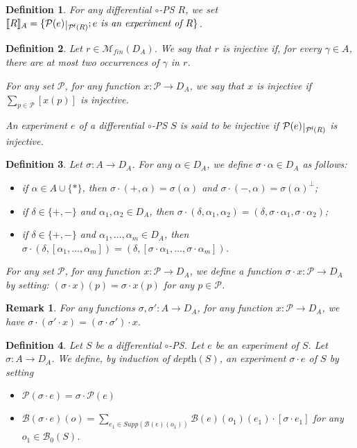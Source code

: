 \documentclass{article}
\theoremstyle{plain}
\newtheorem{definition}{Definition}
\newtheorem{rem}{Remark}
\newcommand{\finitemultisets}[1]{\mathcal{M}_\textit{fin}(#1)}
\newcommand{\depthof}[1]{\textit{depth}(#1)}
\def\restriction#1#2{\mathchoice
              {\setbox1\hbox{${\displaystyle #1}_{\scriptstyle #2}$}
              \restrictionaux{#1}{#2}}
              {\setbox1\hbox{${\textstyle #1}_{\scriptstyle #2}$}
              \restrictionaux{#1}{#2}}
              {\setbox1\hbox{${\scriptstyle #1}_{\scriptscriptstyle #2}$}
              \restrictionaux{#1}{#2}}
              {\setbox1\hbox{${\scriptscriptstyle #1}_{\scriptscriptstyle #2}$}
              \restrictionaux{#1}{#2}}}
\def\restrictionaux#1#2{{#1\,\smash{\vrule height .8\ht1 depth .85\dp1}}_{\,#2}}
\newcommand{\ports}[1]{\mathcal{P}(#1)}
\newcommand{\conclusions}[1]{\mathcal{P}^{\textsf{f}}(#1)}
\newcommand{\sm}[1]{\llbracket #1 \rrbracket}
\newcommand{\boxes}[1]{\mathcal{B}(#1)}
\newcommand{\boxesatzero}[1]{\mathcal{B}_{0}(#1)}
\newcommand{\supp}[1]{\textit{Supp}(#1)}
\begin{document}
\begin{definition}
For any differential $\circ$-PS $R$, we set $\sm{R}_A = \{ \restriction{\ports{e}}{\conclusions{R}} ; e \textit{ is an experiment of } R \}$.
\end{definition}

\begin{definition}\label{defin: injective}
Let $r \in \finitemultisets{D_A}$. We say that $r$ is \emph{injective} if, for every $\gamma \in A$, there are at most two occurrences of $\gamma$ in $r$. 

For any set $\mathcal{P}$, for any function $x : \mathcal{P} \to D_A$, we say that $x$ is \emph{injective} if $\sum_{p \in \mathcal{P}} [x(p)]$ is injective.

An experiment $e$ of a differential $\circ$-PS $S$ is said to be \emph{injective} if $\restriction{\ports{e}}{\conclusions{R}}$ is injective.
\end{definition}

\begin{definition}
Let $\sigma : A \to D_A$. For any $\alpha \in D_A$, we define $\sigma \cdot \alpha \in D_A$ as follows:
\begin{itemize}
\item if $\alpha \in A \cup \{ \ast \}$, then $\sigma \cdot (+, \alpha) = \sigma(\alpha)$ and $\sigma \cdot (-, \alpha) = \sigma(\alpha)^\perp$;
\item if $\delta \in \{ +, - \}$ and $\alpha_1, \alpha_2 \in D_A$, then $\sigma \cdot (\delta, \alpha_1, \alpha_2) = (\delta, \sigma \cdot \alpha_1, \sigma \cdot \alpha_2)$;
\item if $\delta \in \{ +, - \}$ and $\alpha_1, \ldots, \alpha_m \in D_A$, then $\sigma \cdot (\delta, [\alpha_1, \ldots, \alpha_m]) = (\delta, [\sigma \cdot \alpha_1, \ldots, \sigma \cdot \alpha_m])$.
\end{itemize}
For any set $\mathcal{P}$, for any function $x : \mathcal{P} \to D_A$, we define a function $\sigma \cdot x : \mathcal{P} \to D_A$ by setting: $(\sigma \cdot x)(p) = \sigma \cdot x(p)$ for any $p \in \mathcal{P}$.
\end{definition}

\begin{rem}
For any functions $\sigma, \sigma' : A \to D_A$, for any function $x : \mathcal{P} \to D_A$, we have $\sigma \cdot (\sigma' \cdot x) = (\sigma \cdot \sigma') \cdot x$.
\end{rem}

\begin{definition}
Let $S$ be a differential $\circ$-PS. Let $e$ be an experiment of $S$. Let $\sigma : A \to D_A$. We define, by induction of $\depthof{S}$, an experiment $\sigma \cdot e$ of $S$ by setting 
\begin{itemize}
\item $\ports{\sigma \cdot e} = \sigma \cdot \ports{e}$
\item $\boxes{\sigma \cdot e}(o) = \sum_{e_1 \in \supp{\boxes{e}(o_1)}} \boxes{e}(o_1)(e_1) \cdot [\sigma \cdot e_1]$ for any $o_1 \in \boxesatzero{S}$.
\end{itemize}
\end{definition}
\end{document}
